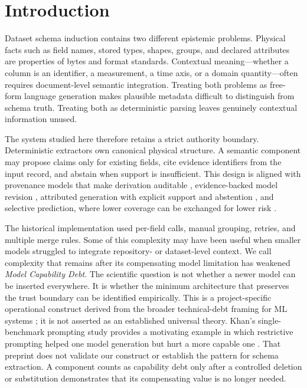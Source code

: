 \documentclass[11pt]{article}
\begin{document}
\section{Introduction}

Dataset schema induction contains two different epistemic problems. Physical facts
such as field names, stored types, shapes, groups, and declared attributes are
properties of bytes and format standards. Contextual meaning---whether a column is
an identifier, a measurement, a time axis, or a domain quantity---often requires
document-level semantic integration. Treating both problems as free-form language
generation makes plausible metadata difficult to distinguish from schema truth.
Treating both as deterministic parsing leaves genuinely contextual information
unused.

The system studied here therefore retains a strict authority boundary. Deterministic
extractors own canonical physical structure. A semantic component may propose
claims only for existing fields, cite evidence identifiers from the input record,
and abstain when support is insufficient. This design is aligned with provenance
models that make derivation auditable \cite{prov2013}, evidence-backed model revision
\cite{gao2023rarr}, attributed generation with explicit support and abstention
\cite{menick2022verifiedquotes}, and selective prediction, where lower coverage can
be exchanged for lower risk \cite{geifman2017selective}.

The historical implementation used per-field calls, manual grouping, retries, and
multiple merge rules. Some of this complexity may have been useful when smaller
models struggled to integrate repository- or dataset-level context. We call
complexity that remains after its compensating model limitation has weakened
\emph{Model Capability Debt}. The scientific question is not whether a newer model
can be inserted everywhere. It is whether the minimum architecture that preserves
the trust boundary can be identified empirically. This is a project-specific
operational construct derived from the broader technical-debt framing for ML
systems \cite{sculley2015debt}; it is not asserted as an established universal
theory. Khan's single-benchmark prompting study provides a motivating example in
which restrictive prompting helped one model generation but hurt a more capable
one \cite{khan2025promptinginversion}. That preprint does not validate our construct
or establish the pattern for schema extraction. A component counts as capability
debt only after a controlled deletion or substitution demonstrates that its
compensating value is no longer needed.
\end{document}

